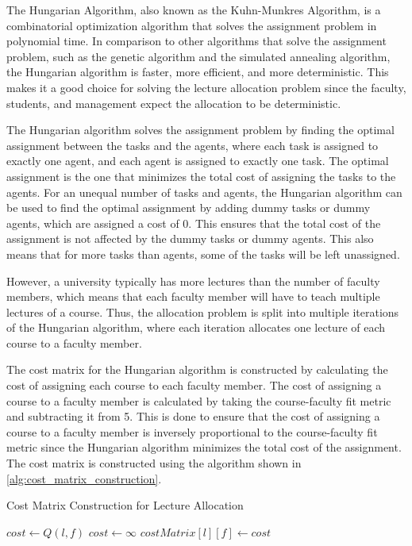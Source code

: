 The Hungarian Algorithm, also known as the Kuhn-Munkres Algorithm, is a combinatorial optimization algorithm that solves the assignment problem in polynomial time. In comparison to other algorithms that solve the assignment problem, such as the genetic algorithm and the simulated annealing algorithm, the Hungarian algorithm is faster, more efficient, and more deterministic. This makes it a good choice for solving the lecture allocation problem since the faculty, students, and management expect the allocation to be deterministic.

The Hungarian algorithm solves the assignment problem by finding the optimal assignment between the tasks and the agents, where each task is assigned to exactly one agent, and each agent is assigned to exactly one task. The optimal assignment is the one that minimizes the total cost of assigning the tasks to the agents. For an unequal number of tasks and agents, the Hungarian algorithm can be used to find the optimal assignment by adding dummy tasks or dummy agents, which are assigned a cost of 0. This ensures that the total cost of the assignment is not affected by the dummy tasks or dummy agents. This also means that for more tasks than agents, some of the tasks will be left unassigned.

However, a university typically has more lectures than the number of faculty members, which means that each faculty member will have to teach multiple lectures of a course. Thus, the allocation problem is split into multiple iterations of the Hungarian algorithm, where each iteration allocates one lecture of each course to a faculty member.

The cost matrix for the Hungarian algorithm is constructed by calculating the cost of assigning each course to each faculty member. The cost of assigning a course to a faculty member is calculated by taking the course-faculty fit metric and subtracting it from 5. This is done to ensure that the cost of assigning a course to a faculty member is inversely proportional to the course-faculty fit metric since the Hungarian algorithm minimizes the total cost of the assignment. The cost matrix is constructed using the algorithm shown in \autoref{alg:cost_matrix_construction}.

\begin{algorithm}[H]
  \caption{Cost Matrix Construction for Lecture Allocation}
  \begin{algorithmic}[1]
    \State $cost \gets Q(l, f)$
    \Else
    \State $cost \gets \infty$
    \EndIf
    \State $costMatrix[l][f] \gets cost$
    \EndFor
    \EndFor
    \EndProcedure
  \end{algorithmic}
  \label{alg:cost_matrix_construction}
\end{algorithm}


